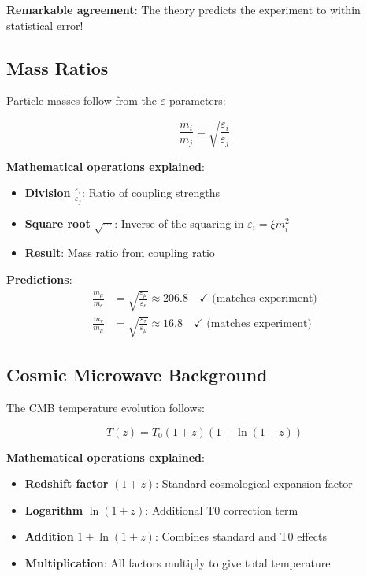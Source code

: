 \documentclass[12pt,a4paper]{article}
\newcommand{\xipar}{\xi}
\theoremstyle{definition}
\theoremstyle{remark}
\begin{document}
	\textbf{Remarkable agreement}: The theory predicts the experiment to within statistical error!
	
	\subsection{Mass Ratios}
	
	Particle masses follow from the $\varepsilon$ parameters:
	
	\begin{equation}
		\frac{m_i}{m_j} = \sqrt{\frac{\varepsilon_i}{\varepsilon_j}}
		\label{eq:mass_ratios}
	\end{equation}
	
	\textbf{Mathematical operations explained}:
	\begin{itemize}
		\item \textbf{Division} $\frac{\varepsilon_i}{\varepsilon_j}$: Ratio of coupling strengths
		\item \textbf{Square root} $\sqrt{\cdots}$: Inverse of the squaring in $\varepsilon_i = \xipar m_i^2$
		\item \textbf{Result}: Mass ratio from coupling ratio
	\end{itemize}
	
	\textbf{Predictions}:
	\begin{align}
		\frac{m_{\mu}}{m_e} &= \sqrt{\frac{\varepsilon_{\mu}}{\varepsilon_e}} \approx 206.8 \quad \checkmark \text{ (matches experiment)} \\
		\frac{m_{\tau}}{m_{\mu}} &= \sqrt{\frac{\varepsilon_{\tau}}{\varepsilon_{\mu}}} \approx 16.8 \quad \checkmark \text{ (matches experiment)}
	\end{align}
	
	\subsection{Cosmic Microwave Background}
	
	The CMB temperature evolution follows:
	
	\begin{equation}
		T(z) = T_0(1+z)\left(1 + \ln(1+z)\right)
		\label{eq:cmb_temperature}
	\end{equation}
	
	\textbf{Mathematical operations explained}:
	\begin{itemize}
		\item \textbf{Redshift factor} $(1+z)$: Standard cosmological expansion factor
		\item \textbf{Logarithm} $\ln(1+z)$: Additional T0 correction term
		\item \textbf{Addition} $1 + \ln(1+z)$: Combines standard and T0 effects
		\item \textbf{Multiplication}: All factors multiply to give total temperature
	\end{itemize}
	
\end{document}
